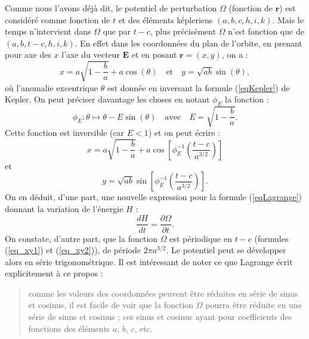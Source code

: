 \documentclass[12pt,paperletter, reqno]{amsart}
\newcommand{\rr}{\mathbf{r}}
\newcommand{\EE}{\mathbf{E}}
\theoremstyle{plain}
\theoremstyle{remark}
\begin{document}
  Comme nous l'avons déjà dit,
  le potentiel de perturbation $\Omega$ (fonction de $\rr$) est considéré comme fonction de $t$ et des éléments képleriens $(a,b,c,h,i,k)$.
  Mais le temps n'intervient dans $\Omega$ que par $t-c$,
  plus précisément $\Omega$ n'est fonction que de $(a,b,t-c,h,i,k)$.
  En effet dans les coordonnées du plan de l'orbite,
  en prenant pour axe des $x$ l'axe du vecteur $\EE$ et en posant $\rr=(x,y)$,
  on a :
  \begin{equation}
    x= a\sqrt{1-\frac{b}{a}} + a\cos(\theta) \quad \mbox{et}\quad y=\sqrt{ab}\sin(\theta),
  \end{equation}
  où l'anomalie excentrique $\theta$ est donnée en inversant la formule (\ref{eqKepler}) de Kepler.
  On peut préciser davantage les choses en notant $\phi_E$ la fonction :
  \begin{equation}
    \phi_E : \theta\mapsto \theta - E\sin(\theta) \quad \mbox{avec} \quad E = \sqrt{1-\frac{b}{a}}.
  \end{equation}
  Cette fonction est inversible (car $E<1$) et on peut écrire :
  \begin{equation}\label{eq_xy1}
    x= a\sqrt{1-\frac{b}{a}} + a\cos\left[\phi_E^{-1}\left(\frac{t-c}{a^{3/2}}\right)\right]
  \end{equation}
  et
  \begin{equation}\label{eq_xy2}
    y=\sqrt{ab}\sin\left[\phi_E^{-1}\left(\frac{t-c}{a^{3/2}}\right)\right].
  \end{equation}
  On en déduit,
  d'une part,
  une nouvelle expression pour la formule (\ref{eqLagrange}) donnant la variation de l'énergie $H$ :
  \begin{equation}\label{eq_dH}
    \frac{dH}{dt} = \frac{\partial \Omega}{\partial t}.
  \end{equation}
  On constate,
  d'autre part,
  que la fonction $\Omega$ est périodique en $t-c$ (formules (\ref{eq_xy1}) et (\ref{eq_xy2})),
  de période $2\pi a^{3/2}$.
  Le potentiel peut se développer alors en série trigonométrique.
  Il est intéressant de noter ce que Lagrange écrit explicitement à ce propos \cite[pages 735--736]{Lagrange2} :
  \begin{quote}
    \og comme les valeurs des coordonnées peuvent être réduites en série de sinus et cosinus, il est facile de voir que la fonction $\Omega$ pourra être réduite en une série de sinus et cosinus ; ces sinus et cosinus ayant pour coefficients des fonctions des éléments $a$, $b$, $c$, etc.\fg{}
  \end{quote}
\end{document}
